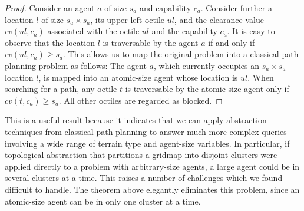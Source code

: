 \begin{proof}
Consider an agent $a$ of size $s_a$ and capability $c_a$.
Consider further a location $l$ of size $s_a \times s_a$, its upper-left octile $\textit{ul}$,
and the clearance value ${cv}(\textit{ul}, c_a)$ associated with the octile $\textit{ul}$ and the capability $c_a$.
It is easy to observe that the location $l$ is traversable by the agent $a$
if and only if ${cv}(\textit{ul}, c_a) \geq s_a$.
This allows us to map the original problem into a classical path planning problem as follows:
The agent $a$, which currently occupies an $s_a \times s_a$ location $l$, is mapped into an atomic-size agent whose location is $ul$. 
When searching for a path, any octile $t$ is traversable by the atomic-size agent only if ${cv}(t, c_a) \geq s_a$.
All other octiles are regarded as blocked.
\end{proof}
This is a useful result because it indicates that we can apply abstraction techniques from classical path planning to answer much more complex queries involving a wide range of terrain type and agent-size variables. 
In particular, if topological abstraction that partitions a gridmap into disjoint clusters were applied directly to a problem with arbitrary-size agents, a large agent could be in several clusters at a time. This raises a number of challenges which we found difficult to handle. The theorem above elegantly eliminates this problem, since an atomic-size agent can be in only one cluster at a time.
